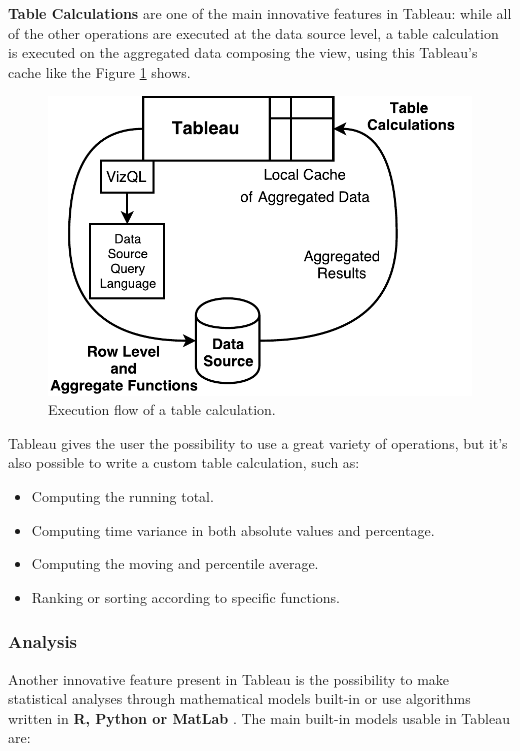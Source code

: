 \textbf{Table Calculations} are one of the main innovative features in Tableau: while all of the other operations are executed at the data source level, a table calculation is executed on the aggregated data composing the view, using this Tableau's cache like the Figure \ref{fig:TableCalculation} shows.


\begin{figure}[ht]
    \begin{center}
        \includegraphics[width=0.8\linewidth]{Figures/TableCalculation}
    \end{center}
    \caption{Execution flow of a table calculation.}
    \label{fig:TableCalculation}
\end{figure}

Tableau gives the user the possibility to use a great variety of operations, but it's also possible to write a custom table calculation, such as:

\begin{itemize}
    \item Computing the running total.
    \item Computing time variance in both absolute values and percentage.
    \item Computing the moving and percentile average.
    \item Ranking or sorting according to specific functions.
\end{itemize}

\subsubsection{Analysis}

Another innovative feature present in Tableau is the possibility to make statistical analyses through mathematical models built-in or use algorithms written in \textbf{R, Python or MatLab} \cite{LearningTableau}. The main built-in models usable in Tableau are:

